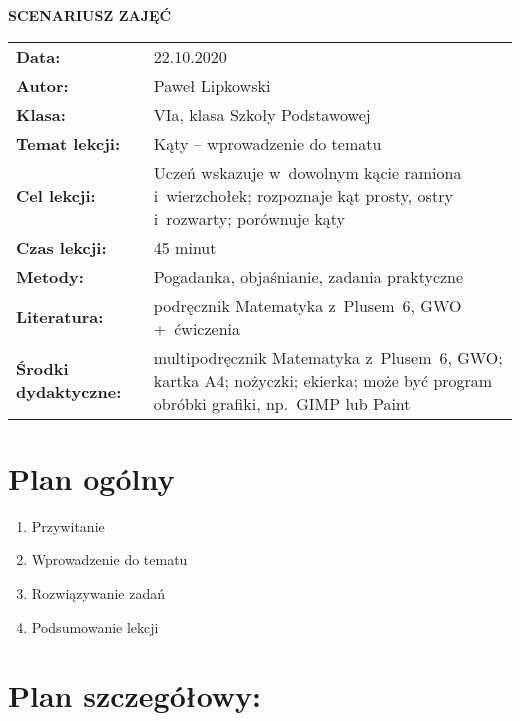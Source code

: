 \documentclass[a5paper,10pt,bibliography=totoc]{article}
\newcommand{\tytul}[1]{%
	\begin{center}%
	\LARGE\textbf{#1}%
	\end{center}%
}
\begin{document}
\begin{center}
	\tytul{SCENARIUSZ ZAJĘĆ}
\end{center}


\begin{tabular}{l m{7cm}}
\textbf{Data:}               & 22.10.2020 \\
\textbf{Autor:}              & Paweł Lipkowski \\
\textbf{Klasa:}              & VIa, klasa Szkoły Podstawowej \\ 
\textbf{Temat lekcji:}       & Kąty – wprowadzenie do tematu \\
\textbf{Cel lekcji:}         & Uczeń wskazuje w~dowolnym kącie ramiona i~wierzchołek; rozpoznaje kąt prosty, ostry i~rozwarty;
porównuje kąty \\
\textbf{Czas lekcji:}        & 45 minut \\
\textbf{Metody:}             & Pogadanka, objaśnianie, zadania praktyczne \\
\textbf{Literatura:}         & podręcznik Matematyka z~Plusem~6, GWO +~ćwiczenia \\
\textbf{Środki dydaktyczne:} & multipodręcznik Matematyka z~Plusem~6, GWO; kartka A4; nożyczki; ekierka; może być program obróbki grafiki, np.~GIMP lub Paint
\end{tabular}


\section{Plan ogólny}

\begin{enumerate}
    \item Przywitanie
    \item Wprowadzenie do tematu
    \item Rozwiązywanie zadań
    \item Podsumowanie lekcji
\end{enumerate}


\section{Plan szczegółowy:}
\end{document}
